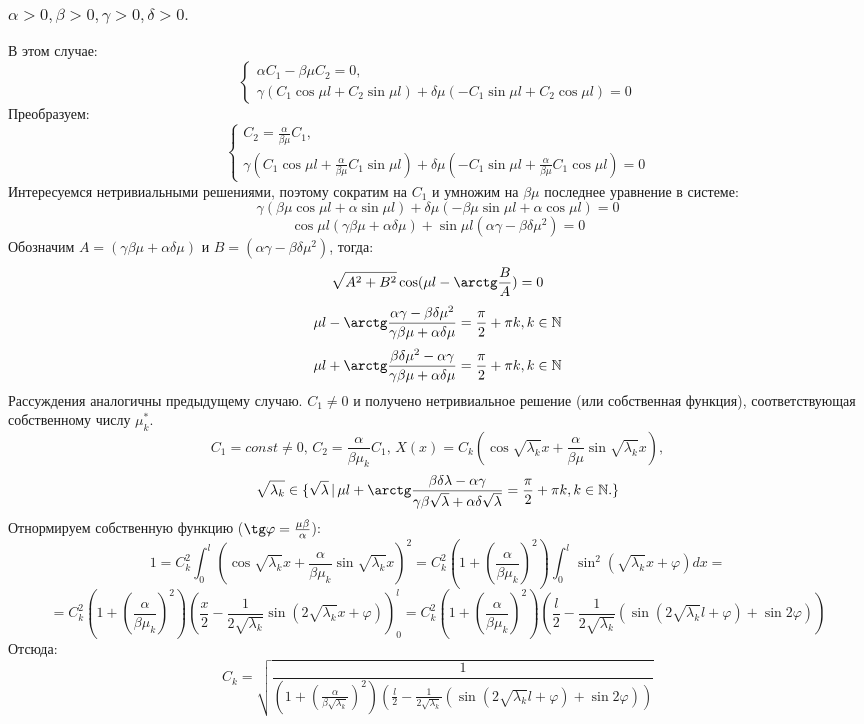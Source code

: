 \documentclass[12pt, a4paper]{report}
\begin{document}
\subsubsection{ $ \alpha > 0, \beta > 0, \gamma > 0, \delta > 0. $}
В этом случае:
\begin{displaymath}
	\begin{cases}
		\alpha C_{1} - \beta \mu C_{2} = 0, \\
		\gamma (C_{1} \cos \mu l + C_{2} \sin \mu l) + \delta \mu ( -C_{1} \sin \mu l + C_{2} \cos \mu l) = 0
	\end{cases}
\end{displaymath}
Преобразуем:
\begin{displaymath}
	\begin{cases}
		C_{2} = \frac{\alpha}{\beta \mu} C_{1}, \\
		\gamma (C_{1} \cos \mu l + \frac{\alpha}{\beta \mu} C_{1} \sin \mu l) + \delta \mu ( -C_{1} \sin \mu l + \frac{\alpha}{\beta \mu} C_{1} \cos \mu l) = 0
	\end{cases}
\end{displaymath}
Интересуемся нетривиальными решениями, поэтому сократим на $C_{1}$ и умножим на $\beta \mu$ последнее уравнение в системе:
\[ \gamma (\beta \mu \cos \mu l + \alpha \sin \mu l) + \delta \mu ( - \beta \mu \sin \mu l + \alpha \cos \mu l) = 0 \]
\[ \cos \mu l (\gamma \beta \mu + \alpha \delta \mu) + \sin \mu l (\alpha \gamma - \beta \delta \mu^2) = 0 \]
Обозначим $ A = (\gamma \beta \mu + \alpha \delta \mu) $ и $ B = (\alpha \gamma - \beta \delta \mu^2) $, тогда:
\[ \sqrt{A^2 + B^2} \cos (\mu l - \arctg \frac{B}{A}) = 0 \]
\[ \mu l - \arctg \frac{\alpha \gamma - \beta \delta \mu^2}{\gamma \beta \mu + \alpha \delta \mu} = \frac{\pi}{2} + \pi k, k \in \mathbb{N} \]
\[ \mu l + \arctg \frac{\beta \delta \mu^2 - \alpha \gamma}{\gamma \beta \mu + \alpha \delta \mu} = \frac{\pi}{2} + \pi k, k \in \mathbb{N} \]
Рассуждения аналогичны предыдущему случаю. $C_{1} \ne 0$ и получено нетривиальное решение (или собственная функция), соответствующая собственному числу $\mu ^{*}_{k}$. 
\[ C_{1} = const \ne 0, \, C_{2} = \frac{\alpha}{\beta \mu_{k}} C_{1}, \, X(x) = C_{k} (\cos \sqrt{\lambda_{k}} x + \frac{\alpha}{\beta \mu} \sin \sqrt{\lambda_{k}} x), \]
\[ \sqrt{\lambda_{k}} \in \{ \sqrt{\lambda} \, | \, \mu l + \arctg \frac{\beta \delta \lambda - \alpha \gamma}{\gamma \beta \sqrt{\lambda} + \alpha \delta \sqrt{\lambda}} = \frac{\pi}{2} + \pi k, k \in \mathbb{N}. \} \]
Отнормируем собственную функцию ($\tg \varphi = \frac{\mu \beta}{\alpha}$):
\[ 1 = C_{k}^2 \int_{0}^{l} (\cos \sqrt{\lambda_{k}} x + \frac{\alpha}{\beta \mu_{k}} \sin \sqrt{\lambda_{k}} x)^2 = C_{k}^2 (1 + (\frac{\alpha}{\beta \mu_{k}})^2) \int_{0}^{l} \sin^2 (\sqrt{\lambda_{k}}x + \varphi) dx = \]
\[ = C_{k}^2 (1 + (\frac{\alpha}{\beta \mu_{k}})^2) (\frac{x}{2} - \frac{1}{2\sqrt{\lambda_{k}}} \sin (2\sqrt{\lambda_{k}}x + \varphi))_{0}^{l} = C_{k}^2 (1 + (\frac{\alpha}{\beta \mu_{k}})^2) (\frac{l}{2} - \frac{1}{2\sqrt{\lambda_{k}}} (\sin (2\sqrt{\lambda_{k}}l + \varphi) + \sin 2\varphi))\]
Отсюда:
\[ C_{k} = \sqrt{\frac{1}{(1 + (\frac{\alpha}{\beta \sqrt{\lambda_{k}}})^2) (\frac{l}{2} - \frac{1}{2\sqrt{\lambda_{k}}} (\sin (2\sqrt{\lambda_{k}}l + \varphi) + \sin 2\varphi))}} \]
\end{document}
